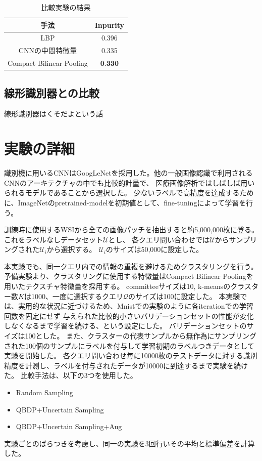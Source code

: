 \begin{table}[h]
  \caption{\label{table:compare_feat}比較実験の結果}
  \center
  \begin{tabular}{c|c} \hline
     手法 & Inpurity \\ \hline
    LBP & 0.396 \\
    CNNの中間特徴量 & 0.335  \\ 
    Compact Bilinear Pooling & $\textbf{0.330}$ \\ \hline
  \end{tabular}
\end{table}

\subsection{線形識別器との比較}
線形識別器はくそだよという話

\section{実験の詳細}
識別機に用いるCNNはGoogLeNetを採用した。他の一般画像認識で利用されるCNNのアーキテクチャの中でも比較的計量で、
医療画像解析ではしばしば用いられるモデルであることから選択した。
少ないラベルで高精度を達成するために、ImageNetのpretrained-modelを初期値として、fine-tuningによって学習を行う。

訓練時に使用するWSIから全ての画像パッチを抽出すると約5,000,000枚に登る。これをラベルなしデータセット$\mathcal{U}$とし、
各クエリ問い合わせでは$\mathcal{U}$からサンプリングされた$\mathcal{U}_i$から選択する。
$\mathcal{U}_i$のサイズは50,000に設定した。

本実験でも、同一クエリ内での情報の重複を避けるためクラスタリングを行う。
予備実験より、クラスタリングに使用する特徴量はCompact Bilinear Poolingを用いたテクスチャ特徴量を採用する。
committeeサイズは10, k-meansのクラスター数$K$は1000、一度に選択するクエリ$\mathcal{Q}$のサイズは100に設定した。
本実験では、実用的な状況に近づけるため、Mnistでの実験のように各iterationでの学習回数を固定にせず
与えられた比較的小さいバリデーションセットの性能が変化しなくなるまで学習を続ける、という設定にした。
バリデーションセットのサイズは100とした。
また、クラスターの代表サンプルから無作為にサンプリングされた100個のサンプルにラベルを付与して学習初期のラベルつきデータとして実験を開始した。
各クエリ問い合わせ毎に10000枚のテストデータに対する識別精度を計測し、ラベルを付与されたデータが10000に到達するまで実験を続けた。
比較手法は、以下の3つを使用した。
\begin{itemize}
  \item Random Sampling
  \item QBDP+Uncertain Sampling
  \item QBDP+Uncertain Sampling+Aug
\end{itemize}
実験ごとのばらつきを考慮し、同一の実験を3回行いその平均と標準偏差を計算した。

